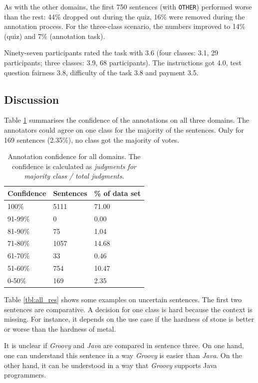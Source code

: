 As with the other domains, the first 750 sentences (with \texttt{OTHER}) performed worse than the rest: 44\% dropped out during the quiz, 16\% were removed during the annotation process. For the three-class scenario, the numbers improved to 14\% (quiz) and 7\% (annotation task).

Ninety-seven participants rated the task with 3.6 (four classes: 3.1, 29 participants; three classes: 3.9, 68 participants). The instructions got 4.0, test question fairness 3.8, difficulty of the task 3.8 and payment 3.5.


\subsection{Discussion}
Table \ref{fig:all_agg} summarises the confidence of the annotations on all three domains. The annotators could agree on one class for the majority of the sentences. Only for 169 sentences (2.35\%), no class got the majority of votes. 

\begin{table}[hp]
\caption{Annotation confidence for all domains. The confidence is calculated as \emph{judgments for majority class / total judgments}.}
\label{fig:all_agg}
\begin{tabularx}{\textwidth}{XXX}
\toprule
Confidence & Sentences & \% of data set \\
\midrule
100\%	&	5111	&	71.00	 \\ 
91-99\%	&	0	&	0.00	 \\ 
81-90\%	&	75	&	1.04	 \\ 
71-80\%	&	1057	&	14.68	 \\ 
61-70\%	&	33	&	0.46	 \\ 
51-60\%	&	754	&	10.47	 \\ 
0-50\%	&	169	&	2.35	 \\ 
\bottomrule
\end{tabularx}
\end{table}

Table \ref{tbl:all_res} shows some examples on uncertain sentences. The first two sentences are comparative. A decision for one class is hard because the context is missing. For instance, it depends on the use case if the hardness of stone is better or worse than the hardness of metal.

It is unclear if \emph{Groovy} and \emph{Java} are compared in sentence three. On one hand, one can understand this sentence in a way \emph{Groovy} is easier than \emph{Java}. On the other hand, it can be understood in a way that \emph{Groovy} supports Java programmers.

